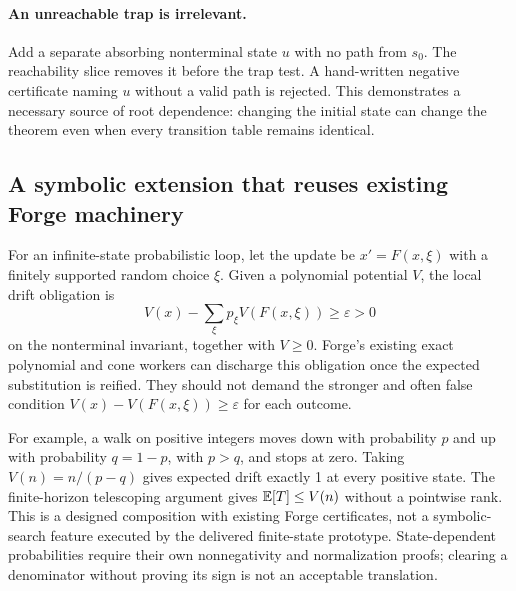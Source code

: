 \paragraph{An unreachable trap is irrelevant.}
Add a separate absorbing nonterminal state $u$ with no path from $s_0$. The
reachability slice removes it before the trap test. A hand-written negative
certificate naming $u$ without a valid path is rejected. This demonstrates a
necessary source of root dependence: changing the initial state can change
the theorem even when every transition table remains identical.

\subsection{A symbolic extension that reuses existing Forge machinery}

For an infinite-state probabilistic loop, let the update be $x'=F(x,\xi)$
with a finitely supported random choice $\xi$. Given a polynomial potential
$V$, the local drift obligation is
\[
 V(x)-\sum_{\xi}p_\xi V(F(x,\xi))\ge\varepsilon>0
\]
on the nonterminal invariant, together with $V\ge0$. Forge's existing exact
polynomial and cone workers can discharge this obligation once the expected
substitution is reified. They should not demand the stronger and often false
condition $V(x)-V(F(x,\xi))\ge\varepsilon$ for each outcome.

For example, a walk on positive integers moves down with probability $p$ and
up with probability $q=1-p$, with $p>q$, and stops at zero. Taking
$V(n)=n/(p-q)$ gives expected drift exactly 1 at every positive state. The
finite-horizon telescoping argument gives $\mathbb{E}[T]\le V(n)$ without a pointwise
rank. This is a designed composition with existing Forge certificates, not a
symbolic-search feature executed by the delivered finite-state prototype.
State-dependent probabilities require their own nonnegativity and normalization
proofs; clearing a denominator without proving its sign is not an acceptable
translation.
